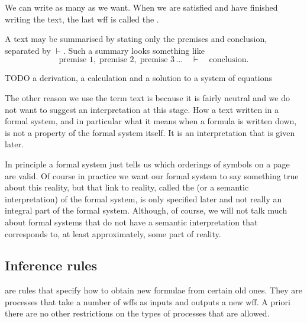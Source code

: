 We can write as many as we want. When we are satisfied and have finished writing the text, the last wff is called the .

A text may be summarised by stating only the premises and conclusion, separated by $\vdash$. Such a summary looks something like
\[ \text{premise 1},\; \text{premise 2},\; \text{premise 3}\, \ldots \quad\vdash\quad \text{conclusion}. \]

\begin{example}
TODO a derivation, a calculation and a solution to a system of equations
\end{example}

The other reason we use the term text is because it is fairly neutral and we do not want to suggest an interpretation at this stage. How a text written in a formal system, and in particular what it means when a formula is written down, is not a property of the formal system itself. It is an interpretation that is given later.

In principle a formal system just tells us which orderings of symbols on a page are valid. Of course in practice we want our formal system to say something true about this reality, but that link to reality, called the  (or a semantic interpretation) of the formal system, is only specified later and not really an integral part of the formal system. Although, of course, we will not talk much about formal systems that do not have a semantic interpretation that corresponds to, at least approximately, some part of reality.

\subsection{Inference rules}
 are rules that specify how to obtain new formulae from certain old ones. They are processes that take a number of wffs as inputs and outputs a new wff. A priori there are no other restrictions on the types of processes that are allowed.

